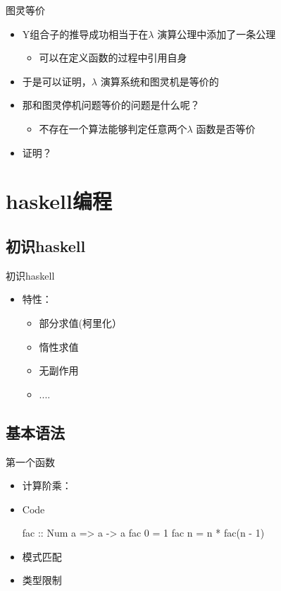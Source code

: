 \documentclass[xcolor=dvipsnames, 11pt]{beamer}
\newenvironment{code}{\begin{block}{Code}\begin{semiverbatim} \begin{footnotesize}}{\end{footnotesize}\end{semiverbatim}\end{block}}
\newenvironment{iit}{\begin{itemize}\setlength{\itemsep}{0.2cm}}{\end{itemize}}
\begin{document}
\begin{frame}[fragile]{图灵等价}
\begin{iit}
\item<2->Y组合子的推导成功相当于在$\lambda$ 演算公理中添加了一条公理
\vspace{0.4cm}
\begin{iit}
\item<3->[]\large{可以在定义函数的过程中引用自身}
\end{iit}
\vspace{0.4cm}
\item<4->于是可以证明，$\lambda$ 演算系统和图灵机是等价的
\item<5->那和图灵停机问题等价的问题是什么呢？
\vspace{0.4cm}
\begin{iit}
\item<6->[]\large{不存在一个算法能够判定任意两个$\lambda$ 函数是否等价}
\end{iit}
\vspace{0.4cm}
\item<7->证明？
\end{iit}
\end{frame}

\section{haskell编程}
\subsection{初识haskell}

\begin{frame}[fragile]{初识haskell}
\begin{iit}
\item<2->特性：
\begin{iit}
\item<3->部分求值(柯里化）
\item<4->惰性求值
\item<5->无副作用
\item<6->....
\end{iit}
\end{iit}
\end{frame}

\subsection{基本语法}
\begin{frame}[fragile]{第一个函数}
\begin{iit}
\item<2->计算阶乘：
\item<3->[]\begin{code}
fac :: Num a => a -> a
fac 0 = 1
fac n = n * fac(n - 1)
\end{code}
\vspace{0.2cm}
\item<4->模式匹配
\item<5->类型限制
\end{iit}
\end{frame}
\end{document}
